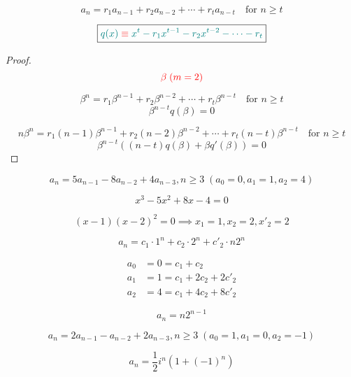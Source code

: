 \begin{frame}{}
  \[
    a_n = r_1 a_{n-1} + r_2 a_{n-2} + \cdots + r_t a_{n-t} \quad \text{for } n \ge t
  \]

  \[
    \boxed{\textcolor{teal}{q(x) \;\textcolor{red}{\equiv}\; x^t - r_1 x^{t-1} - r_2 x^{t-2} - \cdots - r_t}}
  \]

  \pause
  \begin{proof}
    \[
      \textcolor{red}{\beta \; (m = 2)}
    \]

    \pause
    \[
      \beta^n = r_1 \beta^{n-1} + r_2 \beta^{n-2} + \cdots + r_t \beta^{n-t} \quad \text{for } n \ge t
    \]
    \pause
    \vspace{-0.50cm}
    \[
      \beta^{n-t} q(\beta) = 0
    \]

    \pause
    \vspace{-0.50cm}
    \[
      n\beta^{n} = r_1 (n-1) \beta^{n-1} + r_2 (n-2) \beta^{n-2} + \cdots + r_t (n-t) \beta^{n-t} \quad \text{for } n \ge t
    \]
    \pause
    \vspace{-0.50cm}
    \[
      \beta^{n-t} \left(\left(n-t\right)q(\beta) + \beta q'(\beta)\right) = 0
    \]
  \end{proof}
\end{frame}

\begin{frame}{}
  \[
    a_n = 5 a_{n-1} - 8 a_{n-2} + 4 a_{n-3}, n \ge 3 \; (a_0 = 0, a_1 = 1, a_2 = 4)
  \]

  \pause
  \[
    \boxed{x^3 - 5 x^2 + 8 x - 4 = 0}
  \]

  \pause
  \[
    (x-1) (x-2)^2 = 0 \implies x_1 = 1, x_{2} = 2, x'_{2} = 2
  \]

  \pause
  \[
    a_n = c_1 \cdot 1^{n} + c_{2} \cdot 2^{n} + c'_{2} \cdot n 2^{n}
  \]

  \pause
  \vspace{-0.30cm}
  \begin{align*}
    a_0 &= 0 = c_1 + c_2 \\
    a_1 &= 1 = c_1 + 2c_2 + 2c'_{2} \\
    a_2 &= 4 = c_1 + 4c_2 + 8c'_{2}
  \end{align*}

  \pause
  \[
    \boxed{a_n = n 2^{n-1}}
  \]
\end{frame}

\begin{frame}{}
  \[
    a_n = 2a_{n-1} - a_{n-2} + 2a_{n-3}, n \ge 3 \; (a_0 = 1, a_1 = 0, a_2 = -1)
  \]

  \[
    a_n = \frac{1}{2} i^{n} \left(1 + (-1)^n \right)
  \]
\end{frame}

